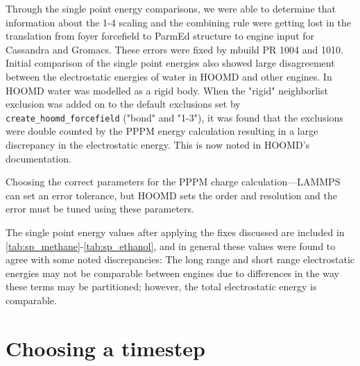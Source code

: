 Through the single point energy comparisons, we were able to determine that information about the 1-4 scaling and the combining rule were getting lost in the translation from foyer forcefield to ParmEd structure to engine input for Cassandra and Gromacs.
These errors were fixed by mbuild PR 1004 and 1010.
Initial comparison of the single point energies also showed large disagreement between the electrostatic energies of water in HOOMD and other engines. 
In HOOMD water was modelled as a rigid body. 
When the "rigid" neighborlist exclusion was added on to the default exclusions set by \lstinline{create_hoomd_forcefield} ("bond" and "1-3"), it was found that the exclusions were double counted by the PPPM energy calculation resulting in a large discrepancy in the electrostatic energy. 
This is now noted in HOOMD's documentation.

Choosing the correct parameters for the PPPM charge calculation---LAMMPS can set an error tolerance, but HOOMD sets the order and resolution and the error must be tuned using these parameters.

The single point energy values after applying the fixes discussed are included in \autoref{tab:sp_methane}-\autoref{tab:sp_ethanol}, and in general these values were found to agree with some noted discrepancies:
The long range and short range electrostatic energies may not be comparable between engines due to differences in the way these terms may be partitioned; however, the total electrostatic energy is comparable.

\section{Choosing a timestep}

